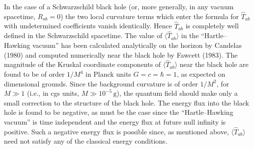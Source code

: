 In the case of a Schwarzschild black hole (or, more generally, in any vacuum
spacetime, \(R_{ab}=0\)) the two local curvature terms which enter the formula for
\(\widehat T_{ab}\) with undetermined coefficients vanish identically. Hence
\(\widehat T_{ab}\) is completely well defined in the Schwarzschild spacetime. The
value of \(\langle\widehat T_{ab}\rangle\) in the ``Hartle--Hawking vacuum'' has
been calculated analytically on the horizon by Candelas (1980) and computed
numerically near the black hole by Fawcett (1983). The magnitude of the Kruskal
coordinate components of \(\langle\widehat T_{ab}\rangle\) near the black hole are
found to be of order \(1/M^4\) in Planck units \(G=c=\hbar=1\), as expected on
dimensional grounds. Since the background curvature is of order \(1/M^2\), for
\(M\gg1\) (i.e., in cgs units, \(M\gg10^{-5}\,\mathrm g\)), the quantum field
should make only a small correction to the structure of the black hole. The energy
flux into the black hole is found to be negative, as must be the case since the
``Hartle--Hawking vacuum'' is time independent and the energy flux at future null
infinity is positive. Such a negative energy flux is possible since, as mentioned
above, \(\langle\widehat T_{ab}\rangle\) need not satisfy any of the classical energy
conditions.

